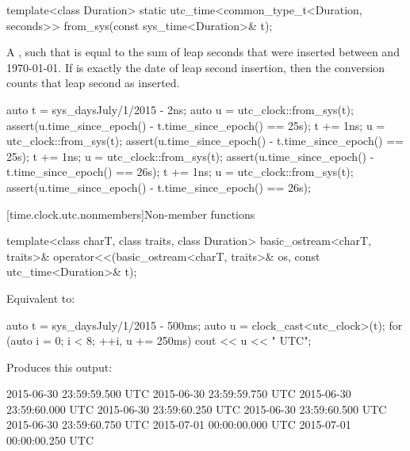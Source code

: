 %
\begin{itemdecl}
template<class Duration>
  static utc_time<common_type_t<Duration, seconds>>
    from_sys(const sys_time<Duration>& t);
\end{itemdecl}

\begin{itemdescr}
\pnum
\returns
A  , such that
is equal to the sum of leap seconds that were inserted
between  and 1970-01-01.
If  is exactly the date of leap second insertion,
then the conversion counts that leap second as inserted.

\begin{example}
\begin{codeblock}
auto t = sys_days{July/1/2015} - 2ns;
auto u = utc_clock::from_sys(t);
assert(u.time_since_epoch() - t.time_since_epoch() == 25s);
t += 1ns;
u = utc_clock::from_sys(t);
assert(u.time_since_epoch() - t.time_since_epoch() == 25s);
t += 1ns;
u = utc_clock::from_sys(t);
assert(u.time_since_epoch() - t.time_since_epoch() == 26s);
t += 1ns;
u = utc_clock::from_sys(t);
assert(u.time_since_epoch() - t.time_since_epoch() == 26s);
\end{codeblock}
\end{example}
\end{itemdescr}

[time.clock.utc.nonmembers]{Non-member functions}

%
\begin{itemdecl}
template<class charT, class traits, class Duration>
  basic_ostream<charT, traits>&
    operator<<(basic_ostream<charT, traits>& os, const utc_time<Duration>& t);
\end{itemdecl}

\begin{itemdescr}
\pnum
\effects
Equivalent to:

\pnum
\begin{example}
\begin{codeblock}
auto t = sys_days{July/1/2015} - 500ms;
auto u = clock_cast<utc_clock>(t);
for (auto i = 0; i < 8; ++i, u += 250ms)
  cout << u << " UTC\n";
\end{codeblock}

Produces this output:
\begin{outputblock}
2015-06-30 23:59:59.500 UTC
2015-06-30 23:59:59.750 UTC
2015-06-30 23:59:60.000 UTC
2015-06-30 23:59:60.250 UTC
2015-06-30 23:59:60.500 UTC
2015-06-30 23:59:60.750 UTC
2015-07-01 00:00:00.000 UTC
2015-07-01 00:00:00.250 UTC
\end{outputblock}
\end{example}
\end{itemdescr}

